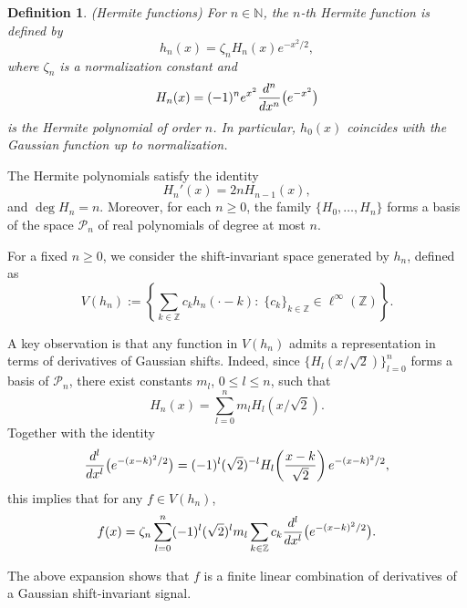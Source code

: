 \documentclass[11pt,oneside,reqno]{amsart}
\newtheorem{definition}[thm]{Definition}
\numberwithin{equation}{section}
\begin{document}
\begin{definition}{\rm (Hermite functions)}
{\rm  For $n\in\mathbb N$, the $n$-th Hermite function is defined by
\begin{equation}\label{hermite.def}
h_n(x)=\zeta_n H_n(x)e^{-x^2/2},
\end{equation}
where $\zeta_n$ is a normalization constant and
\[
H_n(x)=(-1)^n e^{x^2}\frac{{\rm d}^n}{{\rm d}x^n}\big(e^{-x^2}\big)
\]
is the Hermite polynomial of order $n$. In particular, $h_0(x)$ coincides with the
Gaussian function up to normalization.}
\end{definition}

The Hermite polynomials satisfy the identity
\[
H_n'(x)=2nH_{n-1}(x),
\]
and $\deg H_n=n$. Moreover, for each $n\ge 0$, the family
$\{H_0,\ldots,H_n\}$ forms a basis of the space $\mathcal P_n$ of real
polynomials of degree at most $n$.

\medskip

For a fixed $n\ge 0$, we consider the shift-invariant space generated by $h_n$,
defined as
\begin{equation}\label{h.sis}
V(h_n)
:=
\left\{
\sum_{k\in\mathbb Z} c_k h_n(\cdot-k): \;
\{c_k\}_{k\in\mathbb Z}\in\ell^\infty(\mathbb Z)
\right\}.
\end{equation}

A key observation is that any function in $V(h_n)$ admits a representation in
terms of derivatives of Gaussian shifts. Indeed, since
$\{H_l(x/\sqrt2)\}_{l=0}^n$ forms a basis of $\mathcal P_n$, there exist constants
$m_l$, $0\le l\le n$, such that
\begin{equation}\label{hermite.expansion}
H_n(x)=\sum_{l=0}^n m_l H_l(x/\sqrt2).
\end{equation}
Together with the identity
\begin{equation}\label{gaussian.derivative}
\frac{{\rm d}^l}{{\rm d}x^l}\big(e^{-(x-k)^2/2}\big)
=(-1)^l(\sqrt2)^{-l}
H_l\!\left(\frac{x-k}{\sqrt2}\right)e^{-(x-k)^2/2},
\end{equation}
this implies that for any $f\in V(h_n)$,
\begin{equation}\label{hermite.sis.expansion}
f(x)
=
\zeta_n\sum_{l=0}^{n}(-1)^l(\sqrt2)^l m_l
\sum_{k\in\mathbb Z} c_k
\frac{{\rm d}^l}{{\rm d}x^l}\big(e^{-(x-k)^2/2}\big).
\end{equation}

The above expansion shows that $f$ is a finite linear combination of derivatives
of a Gaussian shift-invariant signal.

\medskip
\end{document}
